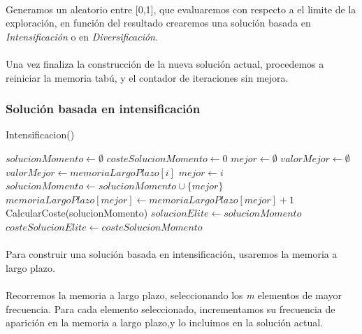 \documentclass{article}
\begin{document}
		\paragraph{}Generamos un aleatorio entre [0,1], que evaluaremos con respecto a el limite de la exploración, en función del resultado crearemos una solución basada en \emph{Intensificación} o en \emph{Diversificación}.
		
		\paragraph{}Una vez finaliza la construcción de la nueva solución actual, procedemos a reiniciar la memoria tabú, y el contador de iteraciones sin mejora.
		
		\subsubsection{Solución basada en intensificación}
		
		\begin{algorithm}[H]
			\caption{Intensificacion()}
			\begin{algorithmic}
				\STATE $solucionMomento \leftarrow \emptyset$
				\STATE $costeSolucionMomento \leftarrow 0$
				\STATE $mejor \leftarrow \emptyset$
				\STATE $valorMejor \leftarrow \emptyset$
				\STATE $valorMejor \leftarrow memoriaLargoPlazo[i]$
				\STATE $mejor \leftarrow i$
				\ENDIF
				\ENDFOR
				\STATE $solucionMomento \leftarrow solucionMomento \cup \{mejor\}$
				\STATE $memoriaLargoPlazo[mejor] \leftarrow memoriaLargoPlazo[mejor]+1$
				\ENDWHILE
				\STATE CalcularCoste(solucionMomento)
				\STATE $solucionElite \leftarrow solucionMomento$
				\STATE $costeSolucionElite \leftarrow costeSolucionMomento$
				\ENDIF
			\end{algorithmic}
		\end{algorithm}
	
		\paragraph{}Para construir una solución basada en intensificación, usaremos la memoria a largo plazo.
		
		\paragraph{}Recorremos la memoria a largo plazo, seleccionando los \emph{m} elementos de mayor frecuencia. Para cada elemento seleccionado, incrementamos su frecuencia de aparición en la memoria a largo plazo,y lo incluimos en la solución actual.
		
\end{document}
